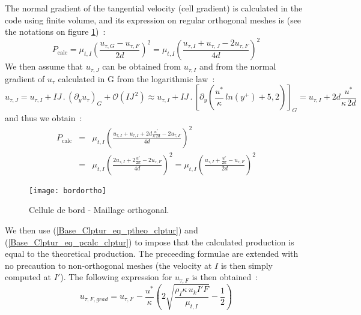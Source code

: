 The normal gradient of the tangential velocity (cell gradient)
is calculated in the code using finite volume, and its expression
on regular orthogonal meshes is (see the notations on
figure \ref{Base_Clptur_fig_bord_ortho_clptur})~:
\begin{equation}
P_{\text{calc}} =
\mu_{t,I}\left(\displaystyle\frac{u_{\tau,G}-u_{\tau,F}}{2d}\right)^2 =
\mu_{t,I}\left(\displaystyle\frac{u_{\tau,I}+u_{\tau,J}-2u_{\tau,F}}{4d}\right)^2
\end{equation}
We then assume that $u_{\tau,J}$ can be obtained from $u_{\tau,I}$
and from the normal gradient of $u_{\tau}$ calculated in G
from the logarithmic law~:
\begin{equation}
\label{Base_Clptur_eq_dvp_lim_utau}
u_{\tau,J}=u_{\tau,I}+ IJ\,.\,(\partial_y u_{\tau})_G+\mathcal{O} (IJ^{\,2}) \approx
u_{\tau,I}+ IJ\,.\,\left[\partial_y \left(\displaystyle
\frac{u^*}{\kappa}\,ln{ (y^+)} + 5,2 \right)\right]_G=
u_{\tau,I}+2d\displaystyle\frac{u^*}{\kappa\, 2d}
\end{equation}
and thus we obtain~:
\begin{equation}\label{Base_Clptur_eq_pcalc_clptur}
\begin{array}{lll}
P_{\text{calc}} &=&
\mu_{t,I}\left(\displaystyle\frac{u_{\tau,I}+u_{\tau,I}+2d\frac{u^*}{\kappa\, 2d}-2u_{\tau,F}}{4d}\right)^2 \\
&=&\mu_{t,I}\left(\displaystyle\frac{2u_{\tau,I}+2\frac{u^*}{2\kappa}-2u_{\tau,F}}{4d}\right)^2 =
\mu_{t,I}\left(\displaystyle\frac{u_{\tau,I}+\frac{u^*}{2\kappa}-u_{\tau,F}}{2d}\right)^2
\end{array}
\end{equation}

\begin{figure}[h]
\centerline{\texttt{[image: bordortho]}}
\caption{\label{Base_Clptur_fig_bord_ortho_clptur}Cellule de bord - Maillage orthogonal.}
\end{figure}

We then use (\ref{Base_Clptur_eq_ptheo_clptur}) and
(\ref{Base_Clptur_eq_pcalc_clptur}) to impose that the calculated
production is equal to the theoretical production. The preceeding
formulae are extended with no precaution to non-orthogonal meshes (the velocity
at $I$ is then simply computed at $I'$).
The following expression for $u_{\tau,F}$ is then obtained~:
\begin{equation}
u_{\tau,F,grad} =u_{\tau,I'}-\displaystyle\frac{u^*}{\kappa}\left(
2\sqrt{\displaystyle\frac{\rho_I\kappa\, u_k I'F}{\mu_{t,I}} }-\displaystyle\frac{1}{2}\right)
\end{equation}

